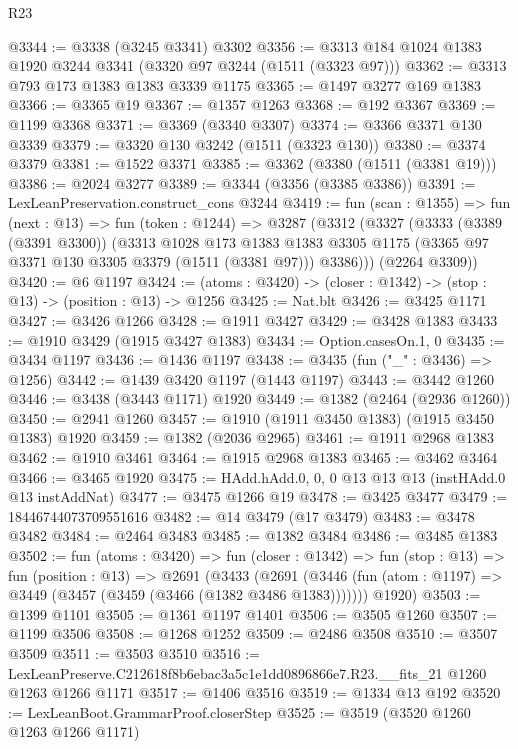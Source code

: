 \begin{lexlean}{R23}
\begin{coremodule}
@3344 := @3338 (@3245 @3341) @3302
@3356 := @3313 @184 @1024 @1383 @1920 @3244 @3341 (@3320 @97 @3244 (@1511 (@3323 @97)))
@3362 := @3313 @793 @173 @1383 @1383 @3339 @1175
@3365 := @1497 @3277 @169 @1383
@3366 := @3365 @19
@3367 := @1357 @1263
@3368 := @192 @3367
@3369 := @1199 @3368
@3371 := @3369 (@3340 @3307)
@3374 := @3366 @3371 @130 @3339
@3379 := @3320 @130 @3242 (@1511 (@3323 @130))
@3380 := @3374 @3379
@3381 := @1522 @3371
@3385 := @3362 (@3380 (@1511 (@3381 @19)))
@3386 := @2024 @3277
@3389 := @3344 (@3356 (@3385 @3386))
@3391 := LexLeanPreservation.construct_cons @3244
@3419 := fun (scan : @1355) =>
  fun (next : @13) =>
  fun (token : @1244) =>
  @3287
    (@3312
      (@3327
        (@3333
          (@3389 (@3391 @3300))
          (@3313
            @1028
            @173
            @1383
            @1383
            @3305
            @1175
            (@3365 @97 @3371 @130 @3305 @3379 (@1511 (@3381 @97)))
            @3386)))
      (@2264 @3309))
@3420 := @6 @1197
@3424 := (atoms : @3420) -> (closer : @1342) -> (stop : @13) -> (position : @13) -> @1256
@3425 := Nat.blt
@3426 := @3425 @1171
@3427 := @3426 @1266
@3428 := @1911 @3427
@3429 := @3428 @1383
@3433 := @1910 @3429 (@1915 @3427 @1383)
@3434 := Option.casesOn.{1, 0}
@3435 := @3434 @1197
@3436 := @1436 @1197
@3438 := @3435 (fun ("_" : @3436) => @1256)
@3442 := @1439 @3420 @1197 (@1443 @1197)
@3443 := @3442 @1260
@3446 := @3438 (@3443 @1171) @1920
@3449 := @1382 (@2464 (@2936 @1260))
@3450 := @2941 @1260
@3457 := @1910 (@1911 @3450 @1383) (@1915 @3450 @1383) @1920
@3459 := @1382 (@2036 @2965)
@3461 := @1911 @2968 @1383
@3462 := @1910 @3461
@3464 := @1915 @2968 @1383
@3465 := @3462 @3464
@3466 := @3465 @1920
@3475 := HAdd.hAdd.{0, 0, 0} @13 @13 @13 (instHAdd.{0} @13 instAddNat)
@3477 := @3475 @1266 @19
@3478 := @3425 @3477
@3479 := 18446744073709551616
@3482 := @14 @3479 (@17 @3479)
@3483 := @3478 @3482
@3484 := @2464 @3483
@3485 := @1382 @3484
@3486 := @3485 @1383
@3502 := fun (atoms : @3420) =>
  fun (closer : @1342) =>
  fun (stop : @13) =>
  fun (position : @13) =>
  @2691
    (@3433
      (@2691 (@3446 (fun (atom : @1197) => @3449 (@3457 (@3459 (@3466 (@1382 @3486 @1383)))))))
      @1920)
@3503 := @1399 @1101
@3505 := @1361 @1197 @1401
@3506 := @3505 @1260
@3507 := @1199 @3506
@3508 := @1268 @1252
@3509 := @2486 @3508
@3510 := @3507 @3509
@3511 := @3503 @3510
@3516 := LexLeanPreserve.C212618f8b6ebac3a5c1e1dd0896866e7.R23.__fits_21 @1260 @1263 @1266 @1171
@3517 := @1406 @3516
@3519 := @1334 @13 @192
@3520 := LexLeanBoot.GrammarProof.closerStep
@3525 := @3519 (@3520 @1260 @1263 @1266 @1171)

\end{coremodule}
\end{lexlean}
